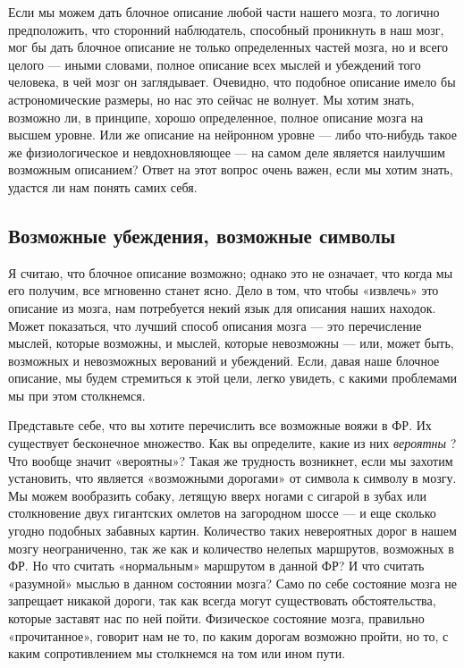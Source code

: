 \documentclass[../main.tex]{subfiles}
\begin{document}
Если мы можем дать блочное описание любой части нашего мозга, то логично предположить, что сторонний наблюдатель, способный проникнуть в наш мозг, мог бы дать блочное описание не только определенных частей мозга, но и всего целого --- иными словами, полное описание всех мыслей и убеждений того человека, в чей мозг он заглядывает. Очевидно, что подобное описание имело бы астрономические размеры, но нас это сейчас не волнует. Мы хотим знать, возможно ли, в принципе, хорошо определенное, полное описание мозга на высшем уровне. Или же описание на нейронном уровне --- либо что-нибудь такое же физиологическое и невдохновляющее --- на самом деле является наилучшим возможным описанием? Ответ на этот вопрос очень важен, если мы хотим знать, удастся ли нам понять самих себя.


\subsection{Возможные убеждения, возможные символы}

Я считаю, что блочное описание возможно; однако это не означает, что когда мы его получим, все мгновенно станет ясно. Дело в том, что чтобы «извлечь» это описание из мозга, нам потребуется некий язык для описания наших находок. Может показаться, что лучший способ описания мозга --- это перечисление мыслей, которые возможны, и мыслей, которые невозможны --- или, может быть, возможных и невозможных верований и убеждений. Если, давая наше блочное описание, мы будем стремиться к этой цели, легко увидеть, с какими проблемами мы при этом столкнемся.

Представьте себе, что вы хотите перечислить все возможные вояжи в ФР. Их существует бесконечное множество. Как вы определите, какие из них \emph{вероятны} ? Что вообще значит «вероятны»? Такая же трудность возникнет, если мы захотим установить, что является «возможными дорогами» от символа к символу в мозгу. Мы можем вообразить собаку, летящую вверх ногами с сигарой в зубах или столкновение двух гигантских омлетов на загородном шоссе --- и еще сколько угодно подобных забавных картин. Количество таких невероятных дорог в нашем мозгу неограниченно, так же как и количество нелепых маршрутов, возможных в ФР. Но что считать «нормальным» маршрутом в данной ФР? И что считать «разумной» мыслью в данном состоянии мозга? Само по себе состояние мозга не запрещает никакой дороги, так как всегда могут существовать обстоятельства, которые заставят нас по ней пойти. Физическое состояние мозга, правильно «прочитанное», говорит нам не то, по каким дорогам возможно пройти, но то, с каким сопротивлением мы столкнемся на том или ином пути.
\end{document}
